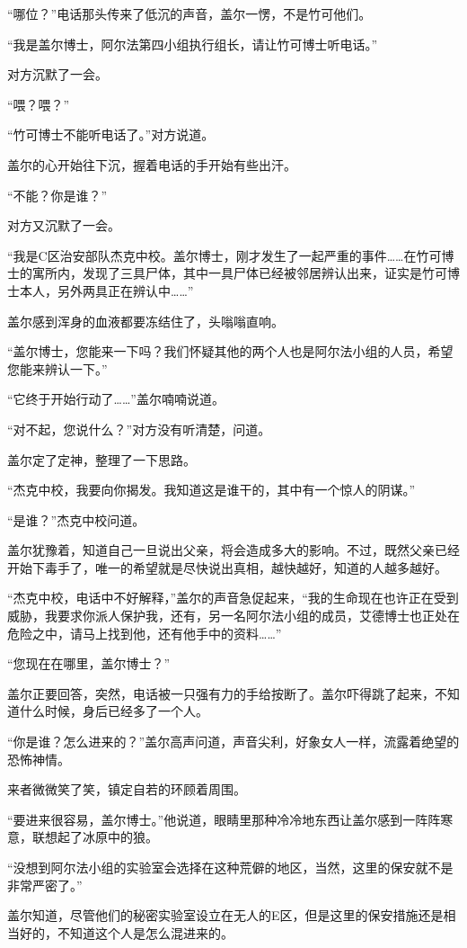 “哪位？”电话那头传来了低沉的声音，盖尔一愣，不是竹可他们。

“我是盖尔博士，阿尔法第四小组执行组长，请让竹可博士听电话。”

对方沉默了一会。

“喂？喂？”

“竹可博士不能听电话了。”对方说道。

盖尔的心开始往下沉，握着电话的手开始有些出汗。

“不能？你是谁？”

对方又沉默了一会。

“我是C区治安部队杰克中校。盖尔博士，刚才发生了一起严重的事件……在竹可博士的寓所内，发现了三具尸体，其中一具尸体已经被邻居辨认出来，证实是竹可博士本人，另外两具正在辨认中……”

盖尔感到浑身的血液都要冻结住了，头嗡嗡直响。

“盖尔博士，您能来一下吗？我们怀疑其他的两个人也是阿尔法小组的人员，希望您能来辨认一下。”

“它终于开始行动了……”盖尔喃喃说道。

“对不起，您说什么？”对方没有听清楚，问道。

盖尔定了定神，整理了一下思路。

“杰克中校，我要向你揭发。我知道这是谁干的，其中有一个惊人的阴谋。”

“是谁？”杰克中校问道。

盖尔犹豫着，知道自己一旦说出父亲，将会造成多大的影响。不过，既然父亲已经开始下毒手了，唯一的希望就是尽快说出真相，越快越好，知道的人越多越好。

“杰克中校，电话中不好解释，”盖尔的声音急促起来，“我的生命现在也许正在受到威胁，我要求你派人保护我，还有，另一名阿尔法小组的成员，艾德博士也正处在危险之中，请马上找到他，还有他手中的资料……”

“您现在在哪里，盖尔博士？”

盖尔正要回答，突然，电话被一只强有力的手给按断了。盖尔吓得跳了起来，不知道什么时候，身后已经多了一个人。

“你是谁？怎么进来的？”盖尔高声问道，声音尖利，好象女人一样，流露着绝望的恐怖神情。

来者微微笑了笑，镇定自若的环顾着周围。

“要进来很容易，盖尔博士。”他说道，眼睛里那种冷冷地东西让盖尔感到一阵阵寒意，联想起了冰原中的狼。

“没想到阿尔法小组的实验室会选择在这种荒僻的地区，当然，这里的保安就不是非常严密了。”

盖尔知道，尽管他们的秘密实验室设立在无人的E区，但是这里的保安措施还是相当好的，不知道这个人是怎么混进来的。

